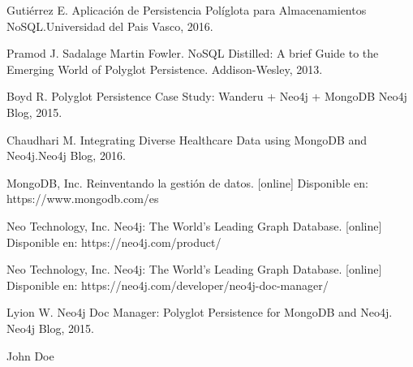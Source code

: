 \documentclass[conference]{IEEEtran}
\begin{document}
%
%
%
\begin{thebibliography}{1}

Guti\'errez E. Aplicaci\'on de Persistencia Pol\'iglota para Almacenamientos NoSQL.Universidad del Pais Vasco, 2016.

Pramod J. Sadalage Martin Fowler. NoSQL Distilled: A brief Guide to the Emerging
World of Polyglot Persistence. Addison-Wesley, 2013.

Boyd R. Polyglot Persistence Case Study: Wanderu + Neo4j + MongoDB Neo4j Blog, 2015.

Chaudhari M. Integrating Diverse Healthcare Data using MongoDB and Neo4j.Neo4j Blog, 2016.

MongoDB, Inc. Reinventando la gestión de datos. [online]
Disponible en: https://www.mongodb.com/es

Neo Technology, Inc. Neo4j: The World’s Leading Graph Database. [online]
Disponible en: https://neo4j.com/product/

Neo Technology, Inc. Neo4j: The World’s Leading Graph Database. [online]
Disponible en: https://neo4j.com/developer/neo4j-doc-manager/

Lyion W. Neo4j Doc Manager: Polyglot Persistence for MongoDB and Neo4j. Neo4j Blog, 2015.

\end{thebibliography}

\begin{IEEEbiography}{John Doe}
\blindtext
\end{IEEEbiography}
\end{document}
